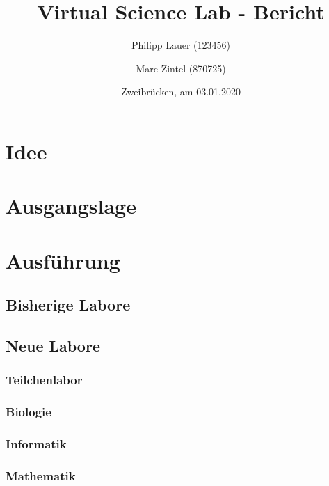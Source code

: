 \documentclass[a4paper, titlepage, 12pt]{scrartcl}
\title{Virtual Science Lab - Bericht}
\author{Philipp Lauer (123456) \and
Marc Zintel (870725)}
\date{Zweibrücken, am 03.01.2020}
\begin{document}
\thispagestyle{empty} 
 \maketitle



\newpage
{} 
\tableofcontents


\newpage            


\section{Idee}

\section{Ausgangslage}

\section{Ausführung}

\subsection{Bisherige Labore}

\subsection{Neue Labore}

\subsubsection{Teilchenlabor}
\subsubsection{Biologie}
\subsubsection{Informatik}
\subsubsection{Mathematik}










\newpage
\listoffigures

\newpage
\listoftables



\appendix 


\end{document}
